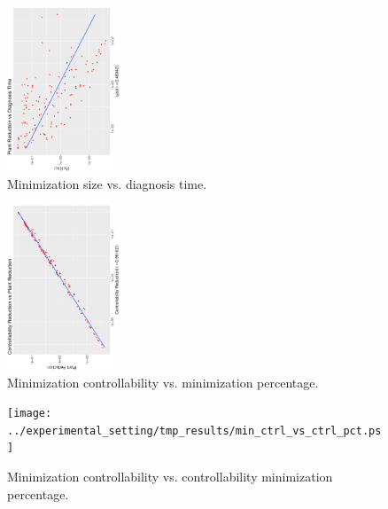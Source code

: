 \begin{figure}[bt]
	\centering
	\SmallPicture
	\includegraphics[width=0.3\textwidth, angle=-90]{../experimental_setting/tmp_results/reduction_vs_diag_time.ps}
	\vspace*{-2mm}
	\caption{Minimization size vs. diagnosis time.}
	\label{fig:size_vs_diag_time}
	\vspace*{-4mm}
	\MediumPicture
\end{figure}
\begin{figure}[bt]
	\centering
	\SmallPicture
	\includegraphics[width=0.3\textwidth, angle=-90]{../experimental_setting/tmp_results/min_ctrl_vs_min_pct.ps}
	\vspace*{-2mm}
	\caption{Minimization controllability vs. minimization percentage.}
	\label{fig:min_ctr_vs_min_pct}
	\vspace*{-4mm}
	\MediumPicture
\end{figure}

\begin{figure}[bt]
	\centering
	\SmallPicture
	\texttt{[image: ../experimental\_setting/tmp\_results/min\_ctrl\_vs\_ctrl\_pct.ps]}
	\vspace*{-2mm}
	\caption{Minimization controllability vs. controllability minimization percentage.}
	\label{fig:min_ctr_vs_ctrl_pct}
	\vspace*{-4mm}
	\MediumPicture
\end{figure}

